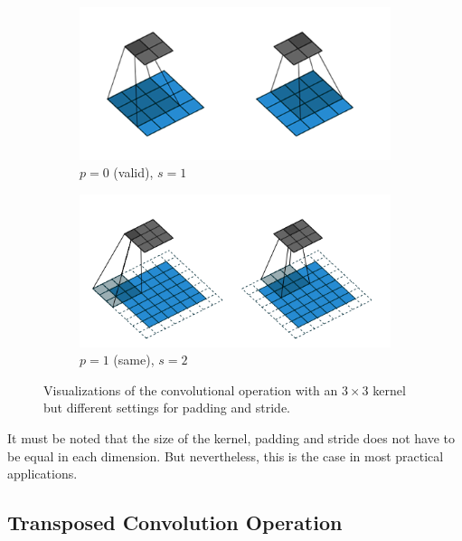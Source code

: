 \begin{figure}[htpb]
\centering
\begin{subfigure}{0.5\textwidth}
  \centering
  \includegraphics[width=.9\linewidth]{figures/conv_valid.png}
  \caption{$p=0$ (valid), $s=1$}
  \label{fig:conv_valid}
\end{subfigure}%
\begin{subfigure}{0.5\textwidth}
  \centering
  \includegraphics[width=0.9\linewidth]{figures/conv_same.png}
  \caption{$p=1$ (same), $s=2$}
  \label{fig:conv_same}
\end{subfigure}
\caption[Convolution operation]{Visualizations of the convolutional operation with an $3 \times 3$ kernel but different settings for padding and stride.}
\label{fig:conv}
\end{figure}

It must be noted that the size of the kernel, padding and stride does not have to be equal in each dimension. But nevertheless, this is the case in most practical applications.

\subsection{Transposed Convolution Operation}

